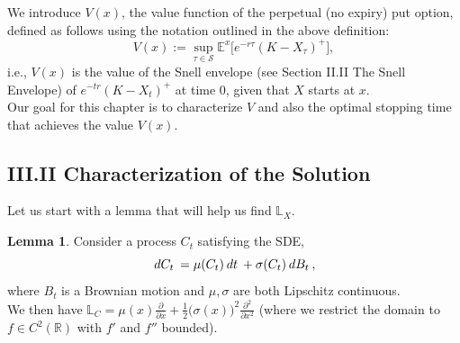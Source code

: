 \documentclass[12pt]{article}
\newcommand{\cS}{\mathcal{S}}
\newcommand{\E}{\mathbb{E}}
\newcommand{\R}{\mathbb{R}}
\newcommand{\bL}{\mathbb{L}}
\newcommand{\df}[1]{\hspace{2 px} d #1 \hspace{2 px}}
\theoremstyle{definition}
\newtheorem{lemma}{Lemma}
\begin{document}
We introduce $V(x)$, the value function of the perpetual (no expiry) put option, defined as follows using the notation outlined in the above definition:
\[
    V(x) := \sup_{\tau \in \cS} \E^x \Big [ e^{-r\tau} (K - X_\tau)^+ \Big ],
\]
i.e., $V(x)$ is the value of the Snell envelope (see Section II.II The Snell Envelope) of $e^{-tr} (K - X_t)^+$ at time 0, given that $X$ starts at $x$. \\
Our goal for this chapter is to characterize $V$ and also the optimal stopping time that achieves the value $V(x)$. \\

\subsection*{\quad III.II Characterization of the Solution}\label{sec:III.II}
Let us start with a lemma that will help us find $\bL_X$.
\begin{lemma} \cite{protter2005}
    Consider a process $C_t$ satisfying the SDE,
    \[
        \df{C_t} = \mu(C_t) \df{t} + \sigma(C_t) \df{B_t},
    \]
    where $B_t$ is a Brownian motion and $\mu, \sigma$ are both Lipschitz continuous. \\
    We then have $\bL_C = \mu(x) \frac{\partial}{\partial x} + \frac{1}{2} \big ( \sigma(x) \big )^2 \frac{\partial^2}{\partial x^2}$ (where we restrict the domain to $f \in C^2(\R)$ with $f'$ and $f''$ bounded).
\end{lemma}
\end{document}
